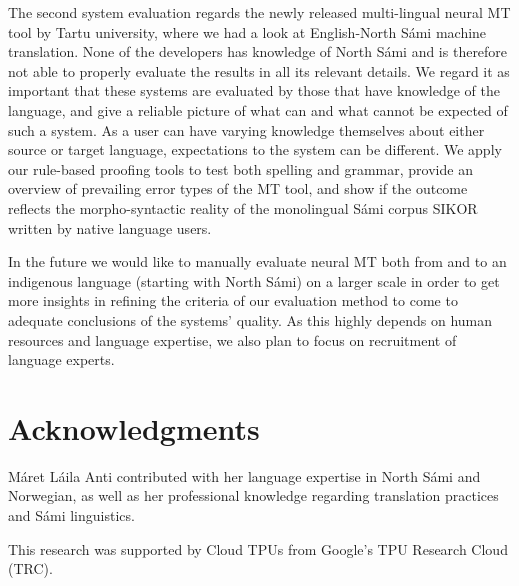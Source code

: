 \documentclass{flammie}
\begin{document}
The second system evaluation regards the newly released multi-lingual neural MT
tool by Tartu university, where we had a look at English-North Sámi machine
translation. None of the developers has knowledge of North Sámi and is therefore
not able to properly evaluate the results in all its relevant details. We regard
it as important that these systems are evaluated by those that have knowledge of
the language, and give a reliable picture of what can and what cannot be
expected of such a system. As a user can have varying knowledge themselves about
either source or target language, expectations to the system can be different.
We apply our rule-based proofing tools to test both spelling and grammar,
provide an overview of prevailing error types of the MT tool, and show if the
outcome reflects the morpho-syntactic reality of the monolingual Sámi corpus
SIKOR written by native language users.



In the future we would like to manually evaluate neural MT both from and to an
indigenous language (starting with North Sámi) on a larger scale in order to get
more insights in refining the criteria of our evaluation method to come to
adequate conclusions of the systems' quality. As this highly depends on human
resources and language expertise, we also plan to focus on recruitment of
language experts.




\section*{Acknowledgments}

Máret Láila Anti contributed with her language expertise in North Sámi and
Norwegian, as well as her professional knowledge regarding translation practices
and Sámi linguistics.

This research was supported by Cloud TPUs from Google’s TPU Research Cloud (TRC).



\end{document}
